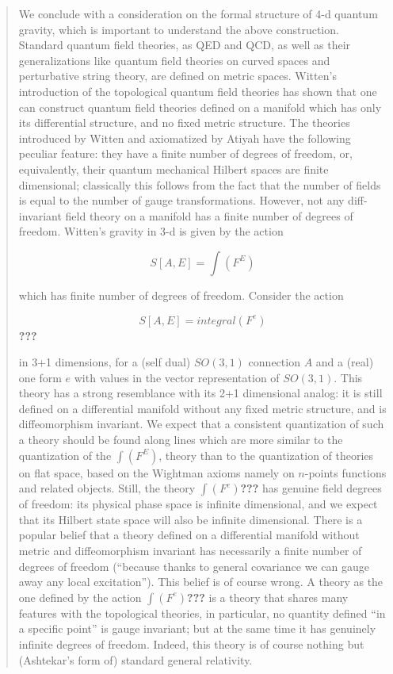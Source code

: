 \documentclass{article}
\begin{document}
\begin{quote}
We conclude with a consideration on the formal structure of 4-d quantum
gravity, which is important to understand the above construction.
Standard quantum field theories, as QED and QCD, as well as their
generalizations like quantum field theories on curved spaces and
perturbative string theory, are defined on metric spaces. Witten's
introduction of the topological quantum field theories has shown that
one can construct quantum field theories defined on a manifold which has
only its differential structure, and no fixed metric structure. The
theories introduced by Witten and axiomatized by Atiyah have the
following peculiar feature: they have a finite number of degrees of
freedom, or, equivalently, their quantum mechanical Hilbert spaces are
finite dimensional; classically this follows from the fact that the
number of fields is equal to the number of gauge transformations.
However, not any diff-invariant field theory on a manifold has a finite
number of degrees of freedom. Witten's gravity in 3-d is given by the
action

\[S[A,E] = \int(F^E)\]

which has finite number of degrees of freedom. Consider the action

\[S[A,E] = integral(F^e)\]\textbf{???}

in 3+1 dimensions, for a (self dual) \(SO(3,1)\) connection \(A\) and a
(real) one form \(e\) with values in the vector representation of
\(SO(3,1)\). This theory has a strong resemblance with its 2+1
dimensional analog: it is still defined on a differential manifold
without any fixed metric structure, and is diffeomorphism invariant. We
expect that a consistent quantization of such a theory should be found
along lines which are more similar to the quantization of the
\(\int(F^E)\), theory than to the quantization of theories on flat
space, based on the Wightman axioms namely on \(n\)-points functions and
related objects. Still, the theory \(\int(F^e)\)\textbf{???} has genuine
field degrees of freedom: its physical phase space is infinite
dimensional, and we expect that its Hilbert state space will also be
infinite dimensional. There is a popular belief that a theory defined on
a differential manifold without metric and diffeomorphism invariant has
necessarily a finite number of degrees of freedom (``because thanks to
general covariance we can gauge away any local excitation''). This
belief is of course wrong. A theory as the one defined by the action
\(\int(F^e)\)\textbf{???} is a theory that shares many features with the
topological theories, in particular, no quantity defined ``in a specific
point'' is gauge invariant; but at the same time it has genuinely
infinite degrees of freedom. Indeed, this theory is of course nothing
but (Ashtekar's form of) standard general relativity.


\end{quote}
\end{document}

